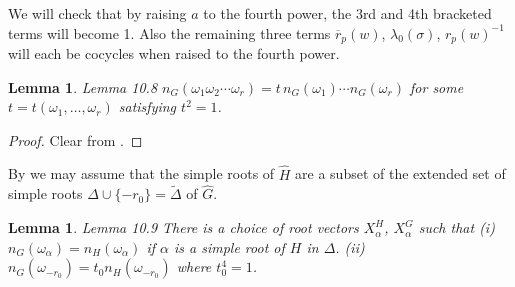 \documentclass[11pt]{amsart}
\theoremstyle{plain}
\newtheorem{lemma}[theorem]{Lemma}
\theoremstyle{definition}
\def\what#1{\widehat#1}
\def\tild#1{\widetilde#1}
\def\DERIZIOTIS{8}
\def\LANGLANDSO{21}
\begin{document}
We will check that by raising $a$ to the fourth power,
the 3rd and 4th bracketed terms will become 1.
Also the remaining three terms $\overline r_p(w)$,
$\lambda_0(\sigma)$, $r_p(w)^{-1}$ will each be cocycles
when raised to the fourth power.


\begin{lemma}{Lemma 10.8}  $n_G(\omega_1\omega_2\cdots\omega_r)
= t\,n_G(\omega_1)\cdots n_G(\omega_r)$ for some $t=t(\omega_1,\ldots,\omega_r)$ satisfying 
$t^2 = 1$.
\end{lemma}

\begin{proof}  Clear from \cite{\LANGLANDSO,2.1.A}.
\end{proof}

By \cite{\DERIZIOTIS} we may assume that the simple roots 
of $\what H$ are a subset of the extended set of simple roots $\Delta\cup\{-r_0\}=
\tild\Delta$ of $\what G$.

\begin{lemma}{Lemma 10.9}  There is a choice of root vectors  $X_\alpha^H$,
$X_\alpha^G$ such that 
{\rm(i)} $n_G(\omega_\alpha) = n_H(\omega_\alpha)$ if
$\alpha$ is a simple root of $H$ in $\Delta$.
{\rm(ii)}  $n_G(\omega_{-r_0}) = t_0n_H(\omega_{-r_0})$
where $t_0^4 = 1$.
\end{lemma}
\end{document}

